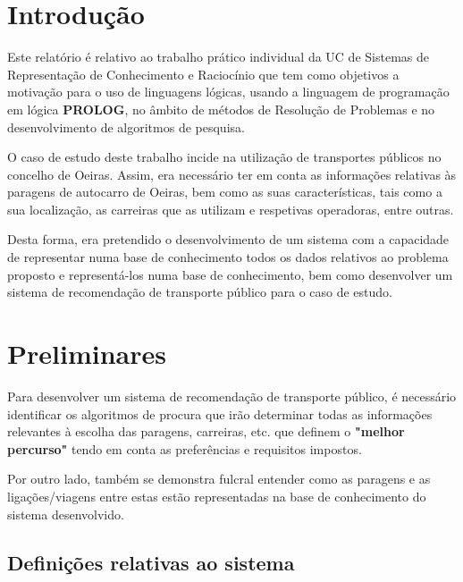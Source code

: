 \documentclass[a4paper,12pt]{report}
\begin{document}
\renewcommand*\contentsname{Índice}
\renewcommand{\bibname}{Referências}

\tableofcontents
\clearpage



\chapter{Introdução}

Este relatório é relativo ao trabalho prático individual da UC de Sistemas de Representação de Conhecimento e Raciocínio que tem como objetivos a motivação para o uso de linguagens lógicas, usando a linguagem de programação em lógica \textbf{PROLOG}, no âmbito de métodos de Resolução de Problemas e no desenvolvimento de algoritmos de pesquisa.
\vspace{0.3cm}
\par O caso de estudo deste trabalho incide na utilização de transportes públicos no concelho de Oeiras. Assim, era necessário ter em conta as informações relativas às paragens de autocarro de Oeiras, bem como as suas características, tais como a sua localização, as carreiras que as utilizam e respetivas operadoras, entre outras.
\par Desta forma, era pretendido o desenvolvimento de um sistema com a capacidade de representar numa base de conhecimento todos os dados relativos ao problema proposto e representá-los numa base de conhecimento, bem como desenvolver um sistema de recomendação de transporte público para o caso de estudo.


\chapter{Preliminares}

Para desenvolver um sistema de recomendação de transporte público, é necessário identificar os algoritmos de procura que irão determinar todas as informações relevantes à escolha das paragens, carreiras, etc. que definem o \textbf{"melhor percurso"} tendo em conta as preferências e requisitos impostos.
\par Por outro lado, também se demonstra fulcral entender como as paragens e as ligações/viagens entre estas estão representadas na base de conhecimento do sistema desenvolvido.

\vspace{0.5cm}

\section{Definições relativas ao sistema}
\label{Definições relativas ao sistema}
\end{document}

